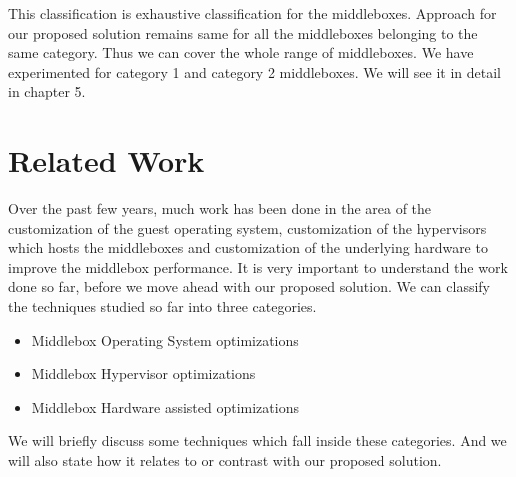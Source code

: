 \documentclass[a4paper,11pt]{report}
\begin{document}

\bigskip
This classification is exhaustive classification for the middleboxes. Approach for our proposed solution remains same for all the middleboxes belonging to the same category. Thus we can cover the whole range of middleboxes. We have experimented for category 1 and category 2 middleboxes. We will see it in detail in chapter 5.   


\chapter{Related Work}
\noindent Over the past few years, much work has been done in the area of the customization of the guest operating system, customization of the hypervisors which hosts the middleboxes and customization of the underlying hardware to improve the middlebox performance. It is very important to understand the work done so far, before we move ahead with our proposed solution. We can classify the techniques studied so far into three categories.
\begin{itemize}
\item Middlebox Operating System optimizations
\item Middlebox Hypervisor optimizations
\item Middlebox Hardware assisted optimizations
\end{itemize}
We will briefly discuss some techniques which fall inside these categories. And we will also state how it relates to or contrast with our proposed solution.
\end{document}
